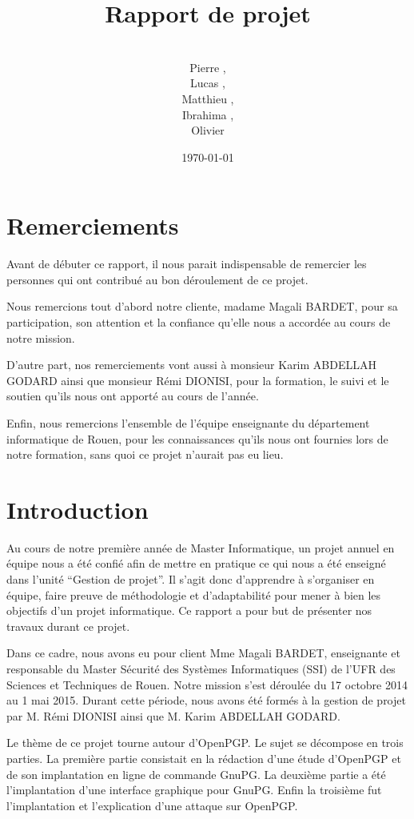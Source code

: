 \documentclass{../res/univ-projet}
\title{Rapport de projet}
\author{\\ Pierre \bsc{Balmelle},\\ Lucas \bsc{Barbay}, \\ Matthieu \bsc{Fin},
\\ Ibrahima \bsc{Sory Barry},\\ Olivier \bsc{Thibault}}
\date{\today}
\begin{document}
\maketitle
\newpage
\thispagestyle{empty}
\setcounter{page}{0}
\section*{Remerciements}
Avant de débuter ce rapport, il nous parait indispensable de remercier les 
personnes qui ont contribué au bon déroulement de ce projet.

Nous remercions tout d'abord notre cliente, madame Magali BARDET, pour sa 
participation, son attention et la confiance qu'elle nous a accordée au 
cours de notre mission.

D'autre part, nos remerciements vont aussi à monsieur Karim ABDELLAH 
GODARD ainsi que monsieur Rémi DIONISI, pour la formation, le suivi 
et le soutien qu'ils nous ont apporté au cours de l'année.

Enfin, nous remercions l'ensemble de l'équipe enseignante du département 
informatique de Rouen, pour les connaissances qu'ils nous ont fournies lors 
de notre formation, sans quoi ce projet n'aurait pas eu lieu.
\newpage
\setcounter{page}{0}
\tableofcontents

\newpage

\section{Introduction}

Au cours de notre première année de Master Informatique, un projet annuel 
en équipe nous a été confié afin de mettre en pratique ce qui nous a 
été enseigné dans l'unité ``Gestion de projet''. Il s'agit donc d'apprendre 
à s'organiser en équipe, faire preuve de méthodologie et d'adaptabilité 
pour mener à bien les objectifs d'un projet informatique. Ce rapport a pour 
but de présenter nos travaux durant ce projet.

Dans ce cadre, nous avons eu pour client Mme Magali BARDET, enseignante et 
responsable du Master Sécurité des Systèmes Informatiques (SSI) de l'UFR des 
Sciences et Techniques de Rouen. Notre mission s'est déroulée du 17 octobre 
2014 au 1 mai 2015. Durant cette période, nous avons été formés à la 
gestion de projet par M. Rémi DIONISI ainsi que M. Karim ABDELLAH GODARD.

Le thème de ce projet tourne autour d'OpenPGP. Le sujet se décompose en trois 
parties. La première partie consistait en la rédaction d'une étude d'OpenPGP 
et de son implantation en ligne de commande GnuPG. La deuxième partie a été 
l'implantation d'une interface graphique pour GnuPG. Enfin la troisième fut 
l'implantation et l'explication d'une attaque sur OpenPGP.
\end{document}
